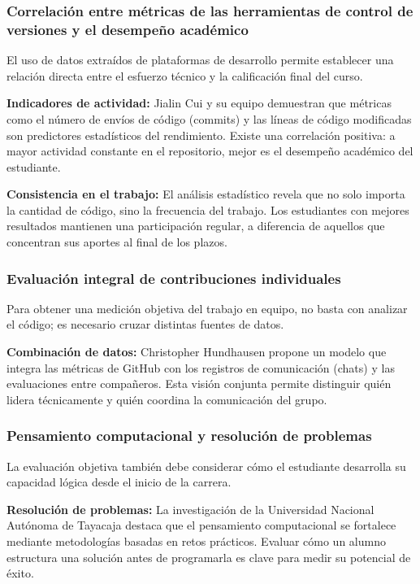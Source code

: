 \documentclass[12pt,a4paper]{article}
\begin{document}
\subsubsection{Correlación entre métricas de las herramientas de control de versiones y el desempeño académico}
El uso de datos extraídos de plataformas de desarrollo permite establecer una relación directa entre el esfuerzo técnico y la calificación final del curso.\cite{cui2023}

\textbf{Indicadores de actividad:} Jialin Cui y su equipo demuestran que métricas como el número de envíos de código (commits) y las líneas de código modificadas son predictores estadísticos del rendimiento. Existe una correlación positiva: a mayor actividad constante en el repositorio, mejor es el desempeño académico del estudiante.\cite{cui2023}

\textbf{Consistencia en el trabajo:} El análisis estadístico revela que no solo importa la cantidad de código, sino la frecuencia del trabajo. Los estudiantes con mejores resultados mantienen una participación regular, a diferencia de aquellos que concentran sus aportes al final de los plazos.

\subsubsection{Evaluación integral de contribuciones individuales}
Para obtener una medición objetiva del trabajo en equipo, no basta con analizar el código; es necesario cruzar distintas fuentes de datos.

\textbf{Combinación de datos:} Christopher Hundhausen propone un modelo que integra las métricas de GitHub con los registros de comunicación (chats) y las evaluaciones entre compañeros. Esta visión conjunta permite distinguir quién lidera técnicamente y quién coordina la comunicación del grupo.\cite{hundhausen2023}

\subsubsection{Pensamiento computacional y resolución de problemas}
La evaluación objetiva también debe considerar cómo el estudiante desarrolla su capacidad lógica desde el inicio de la carrera.

\textbf{Resolución de problemas:} La investigación de la Universidad Nacional Autónoma de Tayacaja destaca que el pensamiento computacional se fortalece mediante metodologías basadas en retos prácticos. Evaluar cómo un alumno estructura una solución antes de programarla es clave para medir su potencial de éxito.
\end{document}
